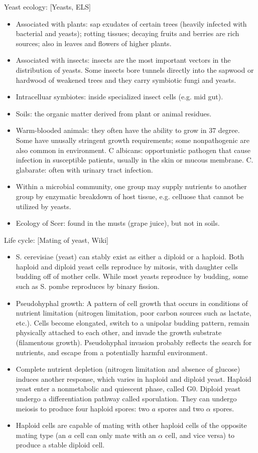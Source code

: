 \documentclass{report}
\begin{document}
Yeast ecology: [Yeasts, ELS]
\begin{itemize}
	\item Associated with plants: sap exudates of certain trees (heavily infected with bacterial and yeasts); rotting tissues; decaying fruits and berries are rich sources; also in leaves and flowers of higher plants. 
	\item Associated with insects: insects are the most important vectors in the distribution of yeasts. Some insects bore tunnels directly into the sapwood or hardwood of weakened trees and they carry symbiotic fungi and yeasts. 
	\item Intracelluar symbiotes: inside specialized insect cells (e.g. mid gut). 
	\item Soils: the organic matter derived from plant or animal residues. 
	\item Warm-blooded animals: they often have the ability to grow in 37 degree. Some have unusally stringent growth requirements; some nonpathogenic are also common in environment. C albicans: opportunistic pathogen that cause infection in susceptible patients, usually in the skin or mucous membrane. C. glabarate: often with urinary tract infection. 
	\item Within a microbial community, one group may supply nutrients to another group by enzymatic breakdown of host tissue, e.g. celluose that cannot be utilized by yeasts. 
	\item Ecology of Scer: found in the musts (grape juice), but not in soils. 
\end{itemize}

Life cycle: [Mating of yeast, Wiki]
\begin{itemize}
	\item S. cerevisiae (yeast) can stably exist as either a diploid or a haploid. Both haploid and diploid yeast cells reproduce by mitosis, with daughter cells budding off of mother cells. While most yeasts reproduce by budding, some such as S. pombe reproduces by binary fission. 
	\item Pseudohyphal growth: A pattern of cell growth that occurs in conditions of nutrient limitation (nitrogen limitation, poor carbon sources such as lactate, etc.). Cells become elongated, switch to a unipolar budding pattern, remain physically attached to each other, and invade the growth substrate (filamentous growth). Pseudohyphal invasion probably reflects the search for nutrients, and escape from a potentially harmful environment.  
	\item Complete nutrient depletion (nitrogen limitation and absence of glucose) induces another response, which varies in haploid and diploid yeast. Haploid yeast enter a nonmetabolic and quiescent phase, called G0. Diploid yeast undergo a differentiation pathway called sporulation. They can undergo meiosis to produce four haploid spores: two $a$ spores and two $\alpha$ spores.	
	\item Haploid cells are capable of mating with other haploid cells of the opposite mating type (an $a$ cell can only mate with an $\alpha$ cell, and vice versa) to produce a stable diploid cell. 
\end{itemize}
\end{document}
